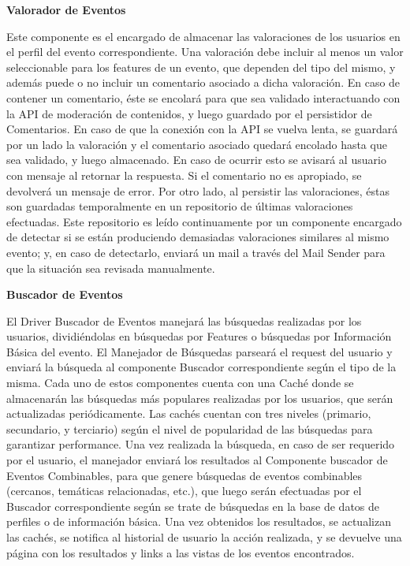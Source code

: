 \textbf{Valorador de Eventos}

Este componente es el encargado de almacenar las valoraciones de los usuarios en el perfil del evento correspondiente. Una valoración debe incluir al menos un valor seleccionable para los features de un evento, que dependen del tipo del mismo, y además puede o no incluir un comentario asociado a dicha valoración. En caso de contener un comentario, éste se encolará para que sea validado interactuando con la API de moderación de contenidos, y luego guardado por el persistidor de Comentarios. En caso de que la conexión con la API se vuelva lenta, se guardará por un lado la valoración y el comentario asociado quedará encolado hasta que sea validado, y luego almacenado. En caso de ocurrir esto se avisará al usuario con mensaje al retornar la respuesta. Si el comentario no es apropiado, se devolverá un mensaje de error. Por otro lado, al persistir las valoraciones, éstas son guardadas temporalmente en un repositorio de últimas valoraciones efectuadas. Este repositorio es leído continuamente por un componente encargado de detectar si se están produciendo demasiadas valoraciones similares al mismo evento; y, en caso de detectarlo, enviará un mail a través del Mail Sender para que la situación sea revisada manualmente.

\textbf{Buscador de Eventos}

El Driver Buscador de Eventos manejará las búsquedas realizadas por los usuarios, dividiéndolas en búsquedas por Features o búsquedas por Información Básica del evento. El Manejador de Búsquedas parseará el request del usuario y enviará la búsqueda al componente Buscador correspondiente según el tipo de la misma. Cada uno de estos componentes cuenta con una Caché donde se almacenarán las búsquedas más populares realizadas por los usuarios, que serán actualizadas periódicamente. Las cachés cuentan con tres niveles (primario, secundario, y terciario) según el nivel de popularidad de las búsquedas para garantizar performance. Una vez realizada la búsqueda, en caso de ser requerido por el usuario, el manejador enviará los resultados al Componente buscador de Eventos Combinables, para que genere búsquedas de eventos combinables (cercanos, temáticas relacionadas, etc.), que luego serán efectuadas por el Buscador correspondiente según se trate de búsquedas en la base de datos de perfiles o de información básica. Una vez obtenidos los resultados, se actualizan las cachés, se notifica al historial de usuario la acción realizada, y se devuelve una página con los resultados y links a las vistas de los eventos encontrados.
